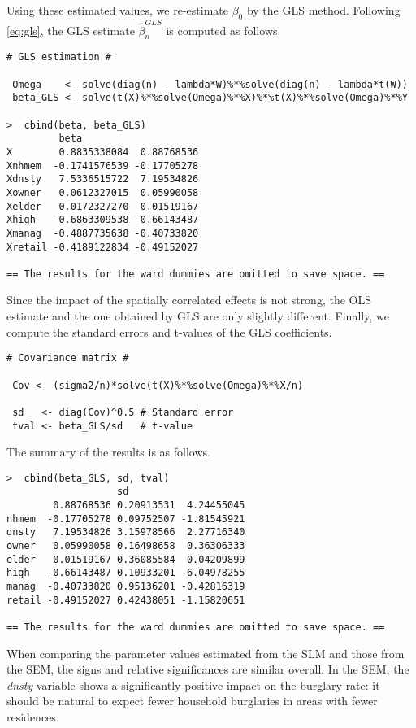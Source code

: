 \documentclass[11pt, A4paper, openany, uplatex]{book}
\begin{document}
Using these estimated values, we re-estimate $\beta_0$ by the GLS method.
Following \eqref{eq:gls}, the GLS estimate $\hat \beta_n^{GLS}$ is computed as follows.
\begin{lstlisting}[basicstyle=\ttfamily\footnotesize, frame=single]
# GLS estimation #

 Omega    <- solve(diag(n) - lambda*W)%*%solve(diag(n) - lambda*t(W))
 beta_GLS <- solve(t(X)%*%solve(Omega)%*%X)%*%t(X)%*%solve(Omega)%*%Y

>  cbind(beta, beta_GLS)
         beta            
X        0.8835338084  0.88768536
Xnhmem  -0.1741576539 -0.17705278
Xdnsty   7.5336515722  7.19534826
Xowner   0.0612327015  0.05990058
Xelder   0.0172327270  0.01519167
Xhigh   -0.6863309538 -0.66143487
Xmanag  -0.4887735638 -0.40733820
Xretail -0.4189122834 -0.49152027

== The results for the ward dummies are omitted to save space. ==
\end{lstlisting}
Since the impact of the spatially correlated effects is not strong, the OLS estimate and the one obtained by GLS are only slightly different.
Finally, we compute the standard errors and t-values of the GLS coefficients.
\begin{lstlisting}[basicstyle=\ttfamily\footnotesize, frame=single]
# Covariance matrix #

 Cov <- (sigma2/n)*solve(t(X)%*%solve(Omega)%*%X/n)

 sd   <- diag(Cov)^0.5 # Standard error
 tval <- beta_GLS/sd   # t-value
\end{lstlisting}
The summary of the results is as follows. 
\begin{lstlisting}[basicstyle=\ttfamily\footnotesize, frame=single]
>  cbind(beta_GLS, sd, tval)
                   sd
        0.88768536 0.20913531  4.24455045
nhmem  -0.17705278 0.09752507 -1.81545921
dnsty   7.19534826 3.15978566  2.27716340
owner   0.05990058 0.16498658  0.36306333
elder   0.01519167 0.36085584  0.04209899
high   -0.66143487 0.10933201 -6.04978255
manag  -0.40733820 0.95136201 -0.42816319
retail -0.49152027 0.42438051 -1.15820651

== The results for the ward dummies are omitted to save space. ==
\end{lstlisting}
When comparing the parameter values estimated from the SLM and those from the SEM, the signs and relative significances are similar overall.
In the SEM, the \textit{dnsty} variable shows a significantly positive impact on the burglary rate: it should be natural to expect fewer household burglaries in areas with fewer residences.
\end{document}
